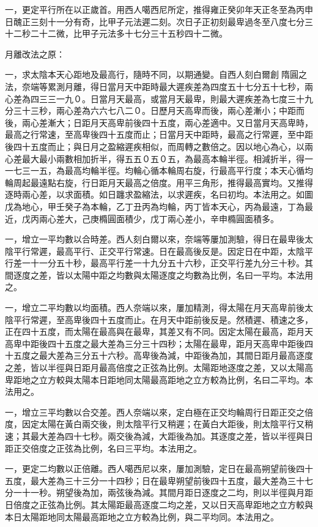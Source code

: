 \begin{pinyinscope}
一，更定平行所在以正歲首。用西人噶西尼所定，推得雍正癸卯年天正冬至為丙申日醜正三刻十一分有奇，比甲子元法遲二刻。次日子正初刻最卑過冬至八度七分三十二秒二十二微，比甲子元法多十七分三十五秒四十二微。

月離改法之原：

一，求太陰本天心距地及最高行，隨時不同，以期通變。自西人刻白爾創隋圓之法，奈端等累測月離，得日當月天中距時最大遲疾差為四度五十七分五十七秒，兩心差為四三三一九０。日當月天最高，或當月天最卑，則最大遲疾差為七度三十九分三十三秒，兩心差為六六七八二０。日歷月天高卑而後，兩心差漸小；中距而後，兩心差漸大；日距月天高卑前後四十五度，兩心差適中。又日當月天高卑時，最高之行常速，至高卑後四十五度而止；日當月天中距時，最高之行常遲，至中距後四十五度而止；與日月之盈縮遲疾相似，而周轉之數倍之。因以地心為心，以兩心差最大最小兩數相加折半，得五五０五０五，為最高本輪半徑。相減折半，得一一七三一五，為最高均輪半徑。均輪心循本輪周右旋，行最高平行度；本天心循均輪周起最遠點右旋，行日距月天最高之倍度。用平三角形，推得最高實均。又推得逐時兩心差，以求面積。如日躔求盈縮法，以求遲疾，名曰初均。本法用之。如圖戊為地心，甲壬癸子為本輪，乙丁丑丙為均輪，丙丁皆本天心，丙為最遠，丁為最近，戊丙兩心差大，己庚橢圓面積少，戊丁兩心差小，辛申橢圓面積多。

一，增立一平均數以合時差。西人刻白爾以來，奈端等屢加測驗，得日在最卑後太陰平行常遲，最高平行、正交平行常速。日在最高後反是。因定日在中距，太陰平行差一十一分五十秒，最高平行差一十九分五十六秒，正交平行差九分三十秒。其間逐度之差，皆以太陽中距之均數與太陽逐度之均數為比例，名曰一平均。本法用之。

一，增立二平均數以均面積。西人奈端以來，屢加精測，得太陽在月天高卑前後太陰平行常遲，至高卑後四十五度而止。在月天中距前後反是。然積遲、積速之多，正在四十五度，而太陽在最高與在最卑，其差又有不同。因定太陽在最高，距月天高卑中距後四十五度之最大差為三分三十四秒；太陽在最卑，距月天高卑中距後四十五度之最大差為三分五十六秒。高卑後為減，中距後為加，其間日距月最高逐度之差，皆以半徑與日距月最高倍度之正弦為比例。太陽距地逐度之差，又以太陽高卑距地之立方較與太陽本日距地同太陽最高距地之立方較為比例，名曰二平均。本法用之。

一，增立三平均數以合交差。西人奈端以來，定白極在正交均輪周行日距正交之倍度，因定太陽在黃白兩交後，則太陰平行又稍遲；在黃白大距後，則太陰平行又稍速；其最大差為四十七秒。兩交後為減，大距後為加。其逐度之差，皆以半徑與日距正交倍度之正弦為比例，名曰三平均。本法用之。

一，更定二均數以正倍離。西人噶西尼以來，屢加測驗，定日在最高朔望前後四十五度，最大差為三十三分一十四秒；日在最卑朔望前後四十五度，最大差為三十七分一十一秒。朔望後為加，兩弦後為減。其間月距日逐度之二均，則以半徑與月距日倍度之正弦為比例。其太陽距最高逐度二均之差，又以日天高卑距地之立方較與本日太陽距地同太陽最高距地之立方較為比例，與二平均同。本法用之。


\end{pinyinscope}
